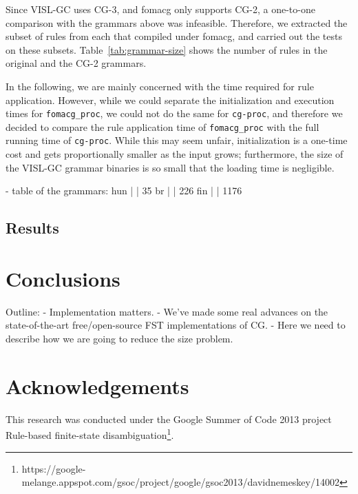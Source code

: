 \documentclass{article}
\begin{document}
Since VISL-GC uses CG-3, and fomacg only supports CG-2, a one-to-one comparison
with the grammars above was infeasible. Therefore, we extracted the subset of
rules from each that compiled under fomacg, and carried out the tests on these
subsets. Table~\ref{tab:grammar-size} shows the number of rules in the original
and the CG-2 grammars.

In the following, we are mainly concerned with the time required for rule
application. However, while we could separate the initialization and execution
times for \texttt{fomacg\_proc}, we could not do the same for \texttt{cg-proc},
and therefore we decided to compare the rule application time of
\texttt{fomacg\_proc} with the full running time of \texttt{cg-proc}.
While this may seem unfair, initialization is a one-time cost and gets
proportionally smaller as the input grows; furthermore, the size of the VISL-GC
grammar binaries is so small that the loading time is negligible.

- table of the grammars: %
  hun | | 35 
  br  | | 226
  fin | | 1176

\subsection{Results}

\section{Conclusions}
\label{sec:conclusion}
Outline:
- Implementation matters.
- We've made some real advances on the state-of-the-art free/open-source
  FST implementations of CG. 
- Here we need to describe how we are going to reduce the size problem.


\section*{Acknowledgements}
This research was conducted under the Google Summer of Code 2013 project
Rule-based finite-state disambiguation\footnote{https://google-melange.appspot.com/gsoc/project/google/gsoc2013/davidnemeskey/14002}.

\cite{Karlsson:1990} %
\cite{Hulden:2011} %
\cite{Peltonen:2011} %
\cite{Tapanainen:1996} %



\end{document}
